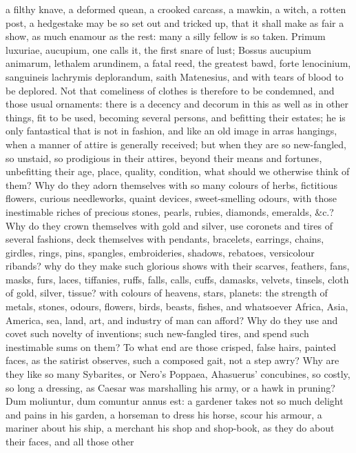 {a filthy knave, a deformed quean, a crooked carcass, a mawkin, a witch,
a rotten post, a hedgestake may be so set out and tricked up, that it
shall make as fair a show, as much enamour as the rest: many a silly
fellow is so taken. Primum luxuriae, aucupium, one calls it, the first
snare of lust; Bossus aucupium animarum, lethalem arundinem, a
fatal reed, the greatest bawd, forte lenocinium, sanguineis lachrymis
deplorandum, saith Matenesius, and with tears of blood to be
deplored. Not that comeliness of clothes is therefore to be condemned,
and those usual ornaments: there is a decency and decorum in this as
well as in other things, fit to be used, becoming several persons, and
befitting their estates; he is only fantastical that is not in fashion,
and like an old image in arras hangings, when a manner of attire is
generally received; but when they are so new-fangled, so unstaid, so
prodigious in their attires, beyond their means and fortunes,
unbefitting their age, place, quality, condition, what should we
otherwise think of them? Why do they adorn themselves with so many
colours of herbs, fictitious flowers, curious needleworks, quaint
devices, sweet-smelling odours, with those inestimable riches of
precious stones, pearls, rubies, diamonds, emeralds, \&c.? Why do they
crown themselves with gold and silver, use coronets and tires of
several fashions, deck themselves with pendants, bracelets, earrings,
chains, girdles, rings, pins, spangles, embroideries, shadows,
rebatoes, versicolour ribands? why do they make such glorious shows
with their scarves, feathers, fans, masks, furs, laces, tiffanies,
ruffs, falls, calls, cuffs, damasks, velvets, tinsels, cloth of gold,
silver, tissue? with colours of heavens, stars, planets: the strength
of metals, stones, odours, flowers, birds, beasts, fishes, and
whatsoever Africa, Asia, America, sea, land, art, and industry of man
can afford? Why do they use and covet such novelty of inventions; such
new-fangled tires, and spend such inestimable sums on them? To what end
are those crisped, false hairs, painted faces, as the satirist
observes, such a composed gait, not a step awry? Why are they like so
many Sybarites, or Nero's Poppaea, Ahasuerus' concubines, so costly, so
long a dressing, as Caesar was marshalling his army, or a hawk in
pruning? Dum moliuntur, dum comuntur annus est: a gardener
takes not so much delight and pains in his garden, a horseman to dress
his horse, scour his armour, a mariner about his ship, a merchant his
shop and shop-book, as they do about their faces, and all those other
}
